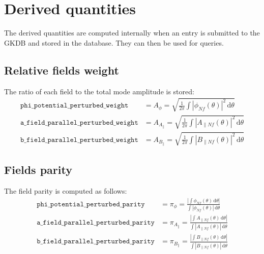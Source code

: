 \documentclass[a4paper]{report}
\begin{document}
\chapter{Derived quantities}

The derived quantities are computed internally when an entry is submitted to the GKDB and stored in the database. They can then be used for queries. 

\section{Relative fields weight} \label{sec:fields:weight}
The ratio of each field to the total mode amplitude is stored:
\begin{align*}
\texttt{phi\_potential\_perturbed\_weight}& =A_\phi = \sqrt{\frac{1}{2\pi}\int |\phi_{Nf}(\theta)|^2\,\textrm{d}\theta}\\
\texttt{a\_field\_parallel\_perturbed\_weight} &= A_{A_\parallel} = \sqrt{\frac{1}{2\pi}\int |A_{\parallel Nf}(\theta)|^2\,\textrm{d}\theta}\\
\texttt{b\_field\_parallel\_perturbed\_weight} &= A_{B_\parallel} = \sqrt{\frac{1}{2\pi}\int |B_{\parallel Nf}(\theta)|^2\,\textrm{d}\theta}
\end{align*}

\section{Fields parity} \label{sec:fields:parity}
The field parity is computed as follows:
\begin{align*}
\texttt{phi\_potential\_perturbed\_parity}& =\pi_\phi = \frac{\left| \int \phi_{Nf}(\theta) \,\textrm{d}\theta \right|}{\int |\phi_{Nf}(\theta)| \,\textrm{d}\theta}\\
\texttt{a\_field\_parallel\_perturbed\_parity} &=\pi_{A_\parallel} = \frac{\left| \int A_{\parallel Nf}(\theta) \,\textrm{d}\theta \right|}{\int |A_{\parallel Nf}(\theta)| \,\textrm{d}\theta}\\ 
\texttt{b\_field\_parallel\_perturbed\_parity} &= \pi_{B_\parallel} = \frac{\left| \int B_{\parallel Nf}(\theta) \,\textrm{d}\theta \right|}{\int |B_{\parallel Nf}(\theta)| \,\textrm{d}\theta}
\end{align*}
\end{document}
